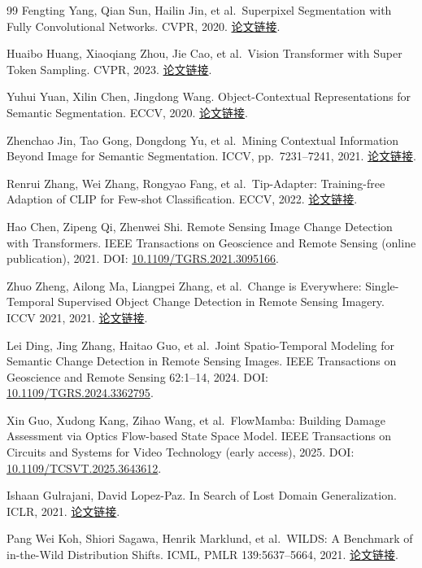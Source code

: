 \documentclass[UTF8,a4paper,zihao=-4,fontset=none]{ctexart}
\begin{document}
\begin{thebibliography}{99}
Fengting Yang, Qian Sun, Hailin Jin, et al.~Superpixel Segmentation with Fully Convolutional Networks. CVPR, 2020. \href{https://arxiv.org/abs/2003.12929}{论文链接}.

Huaibo Huang, Xiaoqiang Zhou, Jie Cao, et al.~Vision Transformer with Super Token Sampling. CVPR, 2023. \href{https://arxiv.org/abs/2211.11167}{论文链接}.

Yuhui Yuan, Xilin Chen, Jingdong Wang. Object-Contextual Representations for Semantic Segmentation. ECCV, 2020. \href{https://arxiv.org/abs/1909.11065}{论文链接}.

Zhenchao Jin, Tao Gong, Dongdong Yu, et al.~Mining Contextual Information Beyond Image for Semantic Segmentation. ICCV, pp.~7231--7241, 2021. \href{https://arxiv.org/abs/2108.11819}{论文链接}.

Renrui Zhang, Wei Zhang, Rongyao Fang, et al.~Tip-Adapter: Training-free Adaption of CLIP for Few-shot Classification. ECCV, 2022. \href{https://arxiv.org/abs/2207.09519}{论文链接}.

Hao Chen, Zipeng Qi, Zhenwei Shi. Remote Sensing Image Change Detection with Transformers. IEEE Transactions on Geoscience and Remote Sensing (online publication), 2021. DOI: \href{https://doi.org/10.1109/TGRS.2021.3095166}{10.1109/TGRS.2021.3095166}.

Zhuo Zheng, Ailong Ma, Liangpei Zhang, et al.~Change is Everywhere: Single-Temporal Supervised Object Change Detection in Remote Sensing Imagery. ICCV 2021, 2021. \href{https://arxiv.org/abs/2108.07002}{论文链接}.

Lei Ding, Jing Zhang, Haitao Guo, et al.~Joint Spatio-Temporal Modeling for Semantic Change Detection in Remote Sensing Images. IEEE Transactions on Geoscience and Remote Sensing 62:1--14, 2024. DOI: \href{https://doi.org/10.1109/TGRS.2024.3362795}{10.1109/TGRS.2024.3362795}.

Xin Guo, Xudong Kang, Zihao Wang, et al.~FlowMamba: Building Damage Assessment via Optics Flow-based State Space Model. IEEE Transactions on Circuits and Systems for Video Technology (early access), 2025. DOI: \href{https://doi.org/10.1109/TCSVT.2025.3643612}{10.1109/TCSVT.2025.3643612}.

Ishaan Gulrajani, David Lopez-Paz. In Search of Lost Domain Generalization. ICLR, 2021. \href{https://arxiv.org/abs/2007.01434}{论文链接}.

Pang Wei Koh, Shiori Sagawa, Henrik Marklund, et al.~WILDS: A Benchmark of in-the-Wild Distribution Shifts. ICML, PMLR 139:5637--5664, 2021. \href{https://proceedings.mlr.press/v139/koh21a.html}{论文链接}.


\end{thebibliography}
\end{document}
